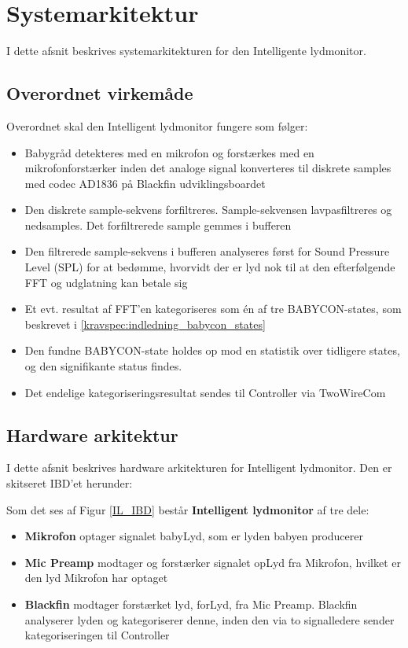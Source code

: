 \newpage
\section{Systemarkitektur}

I dette afsnit beskrives systemarkitekturen for den Intelligente lydmonitor.

\subsection*{Overordnet virkemåde}
Overordnet skal den Intelligent lydmonitor fungere som følger:
\begin{itemize}
	\item Babygråd detekteres med en mikrofon og forstærkes med en mikrofonforstærker inden det analoge signal konverteres til diskrete samples med codec AD1836 på Blackfin udviklingsboardet
	\item Den diskrete sample-sekvens forfiltreres. Sample-sekvensen lavpasfiltreres og nedsamples. Det forfiltrerede sample gemmes i bufferen
	\item Den filtrerede sample-sekvens i bufferen analyseres først for Sound Pressure Level (SPL) for at bedømme, hvorvidt der er lyd nok til at den efterfølgende FFT og udglatning kan betale sig
	\item Et evt. resultat af FFT'en kategoriseres som én af tre BABYCON-states, som beskrevet i \ref{kravspec:indledning_babycon_states} 
	\item Den fundne BABYCON-state holdes op mod en statistik over tidligere states, og den signifikante status findes.
	\item Det endelige kategoriseringsresultat sendes til Controller via TwoWireCom
\end{itemize}


\newpage
\subsection{Hardware arkitektur}
I dette afsnit beskrives hardware arkitekturen for Intelligent lydmonitor. Den er skitseret IBD'et herunder:

Som det ses af Figur \ref{IL_IBD} består \textbf{Intelligent lydmonitor} af tre dele: 
\begin{itemize}
\item \textbf{Mikrofon} optager signalet babyLyd, som er lyden babyen producerer
\item \textbf{Mic Preamp} modtager og forstærker signalet opLyd fra Mikrofon, hvilket er den lyd Mikrofon har optaget 
\item \textbf{Blackfin} modtager forstærket lyd, forLyd, fra Mic Preamp. Blackfin analyserer lyden og kategoriserer denne, inden den via to signalledere sender kategoriseringen til Controller
\end{itemize}


